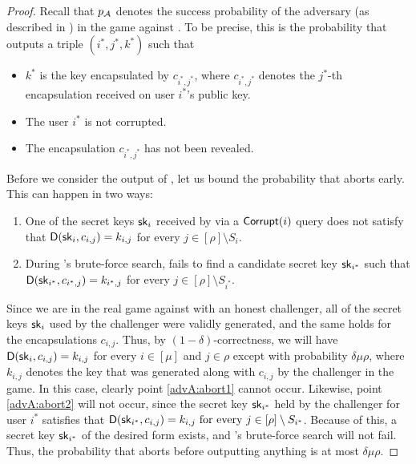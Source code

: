 \begin{proof}
  Recall that \(p_{\mathcal{A}}\) denotes the success probability of the adversary \advA
  (as described in )
  in the \OWECPA game against \KEM.
  To be precise, this is the probability that \advA outputs a triple \((i^{*},j^{*},k^{*})\)
  such that
  \begin{itemize}[label={\textbullet},itemsep=0.1cm]
    \item \(k^{*}\) is the key encapsulated by \(c_{i^{*},j^{*}}\),
          where \(c_{i^{*},j^{*}}\) denotes the \(j^{*}\)-th encapsulation received on user \(i^{*}\)'s public key.
    \item The user \(i^{*}\) is not corrupted.
    \item The encapsulation \(c_{i^{*},j^{*}}\) has not been revealed.
  \end{itemize}

  Before we consider the output of \advA, let us bound
  the probability that \advA aborts early.
  This can happen in two ways:
  \begin{enumerate}
    \item\label{advA:abort1} One of the secret keys \(\mathsf{sk}_{i}\) received by \advA
          via a \(\mathsf{Corrupt}(i)\) query does not satisfy that \(\mathsf{D}(\mathsf{sk}_{i}, c_{i,j}) = k_{i,j}\)
          for every \(j \in [\rho] \setminus S_{i}\).
    \item\label{advA:abort2} During \advA's brute-force search, \advA fails to find a candidate secret key \(\mathsf{sk}_{i^{*}}\)
          such that \(\mathsf{D}(\mathsf{sk}_{i^{*}}, c_{i^{*},j}) = k_{i^{*},j}\) for every \(j \in [\rho] \setminus S_{i^{*}}\).
  \end{enumerate}
  Since we are in the real \OWECPA game against \KEM
  with an honest \OWECPA challenger,
  all of the secret keys \(\mathsf{sk}_{i}\) used by the challenger
  were validly generated, and the same holds for the encapsulations \(c_{i,j}\).
  Thus, by \((1 - \delta)\)-correctness,
  we will have \(\mathsf{D}(\mathsf{sk}_{i},c_{i,j}) = k_{i,j}\) for every \(i \in [\mu]\) and \(j \in \rho\)
  except with probability \(\delta \mu \rho\),
  where \(k_{i,j}\) denotes the key that was generated along with \(c_{i,j}\) by the challenger in the \OWECPA game.
  In this case, clearly point \ref{advA:abort1} cannot occur.
  Likewise, point \ref{advA:abort2} will not occur,
  since the secret key \(\mathsf{sk}_{i^{*}}\) held by the challenger for user \(i^{*}\)
  satisfies that \(\mathsf{D}(\mathsf{sk}_{i^{*}}, c_{i,j}) = k_{i,j} \text{ for every } j \in [\rho] \setminus S_{i^{*}}\).
  Because of this, a secret key \(\mathsf{sk}_{i^{*}}\) of the desired form exists,
  and \advA's brute-force search will not fail.
  Thus, the probability that \advA aborts before outputting anything is at most \(\delta \mu \rho\).


\end{proof}
